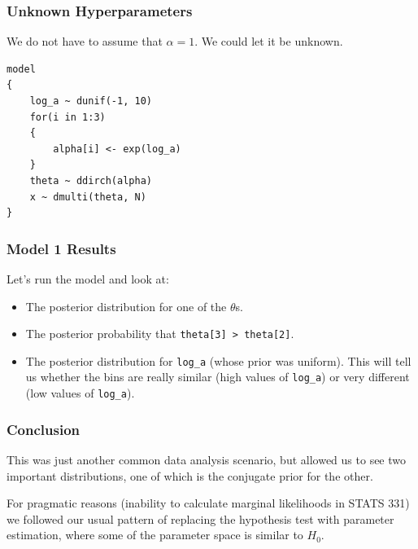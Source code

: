 \documentclass{beamer}
\begin{document}
\begin{frame}[fragile]
\frametitle{Unknown Hyperparameters}
We do not have to assume that $\alpha=1$. We could let it be unknown.
\footnotesize
\begin{verbatim}
model
{
    log_a ~ dunif(-1, 10)
    for(i in 1:3)
    {
        alpha[i] <- exp(log_a)
    }
    theta ~ ddirch(alpha)
    x ~ dmulti(theta, N)
}
\end{verbatim}

\end{frame}


\begin{frame}[fragile]
\frametitle{Model 1 Results}
Let's run the model and look at:

\begin{itemize}
\item The posterior distribution for one of the $\theta$s.\pause
\item The posterior probability that \texttt{theta[3] > theta[2]}.\pause
\item The posterior distribution for \texttt{log_a} (whose prior was
uniform). This will tell us whether the bins are really similar (high values
of \texttt{log_a}) or very different
(low values of \texttt{log_a}).
\end{itemize}

\end{frame}


\begin{frame}[fragile]
\frametitle{Conclusion}
This was just another common data analysis scenario, but allowed us to see two
important distributions, one of which is the conjugate prior for the other.\pause

For pragmatic reasons (inability to calculate marginal likelihoods in STATS 331) we followed
our usual pattern of replacing the hypothesis test with parameter estimation,
where some of the parameter space is similar to $H_0$.
\end{frame}
\end{document}
